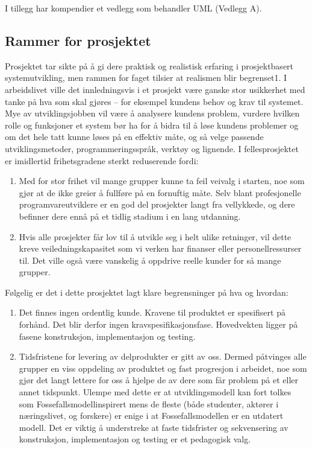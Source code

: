 \documentclass[a4paper]{scrartcl}
\begin{document}
I tillegg har kompendier et vedlegg som behandler UML (Vedlegg A). 

\subsection{Rammer for prosjektet}

Prosjektet tar sikte på å gi dere praktisk og realistisk erfaring i prosjektbasert systemutvikling, men rammen for faget tilsier at realismen blir begrenset1.
I arbeidslivet ville det innledningsvis i et prosjekt være ganske stor usikkerhet med tanke på hva som skal gjøres – for eksempel kundens behov og krav til systemet. Mye av utviklingsjobben vil være å analysere kundens problem, vurdere hvilken rolle og funksjoner et system bør ha for å bidra til å løse kundens problemer og om det hele tatt kunne løses på en effektiv måte, og så velge passende utviklingsmetoder, programmeringsspråk, verktøy og lignende. I fellesprosjektet er imidlertid frihetsgradene sterkt reduserende fordi:

\begin{enumerate}
\item
Med for stor frihet vil mange grupper kunne ta feil veivalg i starten, noe som gjør at de ikke greier å fullføre på en fornuftig måte. Selv blant profesjonelle programvareutviklere er en god del prosjekter langt fra vellykkede, og dere befinner dere ennå på et tidlig stadium i en lang utdanning.

\item
Hvis alle prosjekter får lov til å utvikle seg i helt ulike retninger, vil dette kreve veiledningskapasitet som vi verken har finanser eller personellressurser til. Det ville også være vanskelig å oppdrive reelle kunder for så mange grupper.

\end{enumerate}

Følgelig er det i dette prosjektet lagt klare begrensninger på hva og hvordan:

\begin{enumerate}
\item
Det finnes ingen ordentlig kunde. Kravene til produktet er spesifisert på forhånd. Det blir derfor ingen kravspesifikasjonsfase. Hovedvekten ligger på fasene konstruksjon, implementasjon og testing.

\item
Tidsfristene for levering av delprodukter er gitt av oss. Dermed påtvinges alle grupper en viss oppdeling av produktet og fast progresjon i arbeidet, noe som gjør det langt lettere for oss å hjelpe de av dere som får problem på et eller annet tidspunkt. Ulempe med dette er at utviklingsmodell kan fort tolkes som Fossefallsmodellinspirert mens de fleste (både studenter, aktører i næringslivet, og forskere) er enige i at Fossefallsmodellen er en utdatert modell. Det er viktig å understreke at faste tidsfrister og sekvensering av konstruksjon, implementasjon og testing er et pedagogisk valg.

\end{enumerate}
\end{document}
